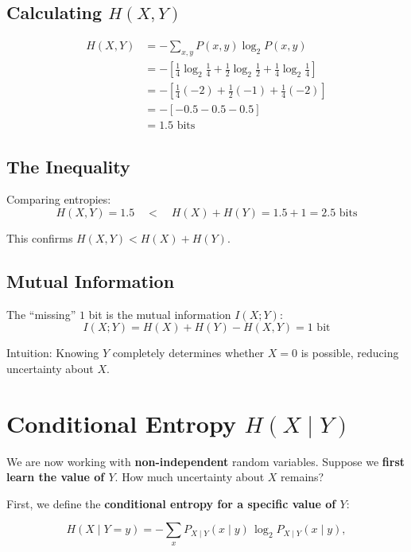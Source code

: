 \documentclass[11pt]{article}
\begin{document}
\subsection*{Calculating $H(X,Y)$}

\begin{align*}
H(X,Y) &= -\sum_{x,y} P(x,y) \log_2 P(x,y) \\
&= -\left[ \tfrac{1}{4}\log_2\tfrac{1}{4} + \tfrac{1}{2}\log_2\tfrac{1}{2} + \tfrac{1}{4}\log_2\tfrac{1}{4} \right] \\
&= -\left[ \tfrac{1}{4}(-2) + \tfrac{1}{2}(-1) + \tfrac{1}{4}(-2) \right] \\
&= -[-0.5 - 0.5 - 0.5] \\
&= \boxed{1.5 \text{ bits}}
\end{align*}

\subsection*{The Inequality}

Comparing entropies:
\begin{equation*}
H(X,Y) = 1.5 \quad < \quad H(X) + H(Y) = 1.5 + 1 = 2.5 \text{ bits}
\end{equation*}

This confirms $H(X,Y) < H(X) + H(Y)$.

\subsection*{Mutual Information}

The ``missing'' $1$ bit is the mutual information $I(X;Y)$:
\begin{equation*}
I(X;Y) = H(X) + H(Y) - H(X,Y) = 1 \text{ bit}
\end{equation*}

Intuition: Knowing $Y$ completely determines whether $X=0$ is possible, reducing uncertainty about $X$.


\section*{Conditional Entropy $H(X \mid Y)$}

We are now working with \textbf{non-independent} random variables. Suppose we \textbf{first learn the value of $Y$}. How much uncertainty about $X$ remains?

First, we define the \textbf{conditional entropy for a specific value of $Y$}:

\[
H(X \mid Y = y) = - \sum_x P_{X \mid Y}(x \mid y) \, \log_2 P_{X \mid Y}(x \mid y),
\]
\end{document}
